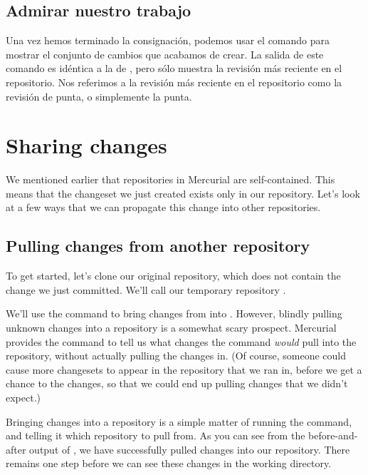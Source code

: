 \subsection{Admirar nuestro trabajo}

Una vez hemos terminado la consignación, podemos usar el comando
 para mostrar el conjunto de cambios que acabamos de crear.
La salida de este comando es idéntica a la de , pero sólo
muestra la revisión más reciente en el repositorio.
Nos referimos a la revisión más reciente en el repositorio como la
revisión de punta, o simplemente la punta.

\section{Sharing changes}

We mentioned earlier that repositories in Mercurial are
self-contained.  This means that the changeset we just created exists
only in our  repository.  Let's look at a few ways
that we can propagate this change into other repositories.

\subsection{Pulling changes from another repository}
\label{sec:tour:pull}

To get started, let's clone our original  repository,
which does not contain the change we just committed.  We'll call our
temporary repository .

We'll use the  command to bring changes from
 into .  However, blindly
pulling unknown changes into a repository is a somewhat scary
prospect.  Mercurial provides the  command to tell us
what changes the  command \emph{would} pull into the
repository, without actually pulling the changes in.
(Of course, someone could cause more changesets to appear in the
repository that we ran  in, before we get a chance to
 the changes, so that we could end up pulling changes that we
didn't expect.)

Bringing changes into a repository is a simple matter of running the
 command, and telling it which repository to pull from.
As you can see from the before-and-after output of , we
have successfully pulled changes into our repository.  There remains
one step before we can see these changes in the working directory.

